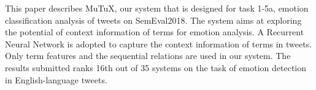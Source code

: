 This paper describes MuTuX, our system that is designed for task 1-5a, emotion classification analysis of tweets on SemEval2018. The system aims at exploring the potential of context information of terms for emotion analysis. A Recurrent Neural Network is adopted to capture the context information of terms in tweets. Only term features and the sequential relations are used in our system. The results submitted ranks 16th out of 35 systems on the task of emotion detection in English-language tweets.
